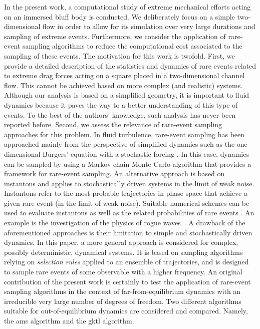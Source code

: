 In the present work, a computational study of extreme mechanical efforts acting on an immersed bluff body is conducted.
We deliberately focus on a simple two-dimensional flow in order to allow for its simulation over very large durations and sampling of extreme events.
Furthermore, we consider the application of rare-event sampling algorithms to reduce the computational cost associated to the sampling of these events.
The motivation for this work is twofold.
First, we provide a detailed description of the statistics and dynamics of rare events related to extreme
drag forces acting on a square placed in a two-dimensional channel flow.
This cannot be achieved based on more complex (and realistic) systems.
Although our analysis is based on a simplified geometry, it is important to fluid dynamics because it paves the way to a better understanding of this type of events.
To the best of the authors' knowledge, such analysis has never been reported before.
Second, we assess the relevance of rare-event sampling approaches for this problem.
In fluid turbulence, rare-event sampling has been approached mainly from the perspective of simplified dynamics such as the one-dimensional Burgers' equation with a stochastic forcing \citep{bec_burgers_2007}. In this case, dynamics can be sampled by using a Markov chain Monte-Carlo algorithm \citep{duben_monte_2008,mesterhazy2011anomalous,mesterhazy2013lattice} that provides a framework for rare-event sampling.
%
An alternative approach is based on instantons \citep{gurarie_instantons_1996,grafke2015instanton} and applies to stochastically driven systems in the limit of weak noise.
Instantons refer to the most probable trajectories in phase space that achieve a given rare event (in the limit of weak noise). Suitable numerical schemes can be used to evaluate instantons as well as the related probabilities of rare events \citep{chernykh_large_2001,grafke_instanton_2013,grigorio_instantons_2017,laurie2015computation,bouchet2014langevin}.
An example is the investigation of the physics of rogue waves~\citep{dematteis2018rogue,dematteis2019experimental}.
%
A drawback of the aforementioned approaches is their limitation to simple and stochastically driven dynamics.
%
%
In this paper, a more general approach is considered for complex, possibly deterministic, dynamical systems.
It is based on sampling algorithms relying on \emph{selection rules} applied to an ensemble of trajectories, and is designed to sample rare events of some observable with a higher frequency.
%
%
An original contribution of the present work is certainly to test the application of rare-event sampling algorithms in the context of far-from-equilibrium dynamics with an irreducible very large number of degrees of freedom.
%
Two different algorithms suitable for out-of-equilibrium dynamics are considered and compared. Namely, the \ac{ams} algorithm and the \ac{gktl} algorithm.

